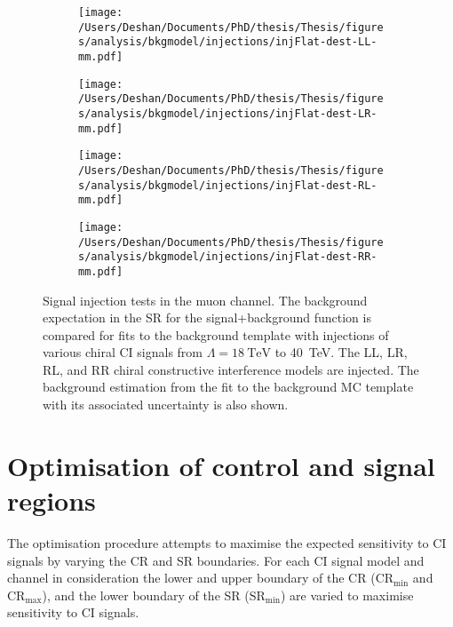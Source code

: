 \begin{figure}[h!]
    \centering
    \begin{subfigure}[b]{0.49\textwidth}
        \centering
        \texttt{[image: /Users/Deshan/Documents/PhD/thesis/Thesis/figures/analysis/bkgmodel/injections/injFlat-dest-LL-mm.pdf]}
        \label{fig:bkgmodel:injmm2}
    \end{subfigure}
    \begin{subfigure}[b]{0.49\textwidth}
        \centering
        \texttt{[image: /Users/Deshan/Documents/PhD/thesis/Thesis/figures/analysis/bkgmodel/injections/injFlat-dest-LR-mm.pdf]}
        \label{fig:bkgmodel:injmm4}
    \end{subfigure}
    \begin{subfigure}[b]{0.49\textwidth}
        \centering
        \texttt{[image: /Users/Deshan/Documents/PhD/thesis/Thesis/figures/analysis/bkgmodel/injections/injFlat-dest-RL-mm.pdf]}
        \label{fig:bkgmodel:injmm6}
    \end{subfigure}
    \begin{subfigure}[b]{0.49\textwidth}
        \centering
        \texttt{[image: /Users/Deshan/Documents/PhD/thesis/Thesis/figures/analysis/bkgmodel/injections/injFlat-dest-RR-mm.pdf]}
        \label{fig:bkgmodel:injmm8}
    \end{subfigure}
    \caption[Signal injection tests in the muon channel for destructive interference models]{Signal injection tests in the muon channel. The background expectation in the SR for the signal+background function is compared for fits to the background template with injections of various chiral CI signals from $\Lambda = \SI{18}{\tera\electronvolt}$ to \SI{40}{\tera\electronvolt}. The LL, LR, RL, and RR chiral constructive interference models are injected. The background estimation from the fit to the background MC template with its associated uncertainty is also shown.}
    \label{fig:bkgmodel:injmmdest}
\end{figure}

\clearpage
\section{Optimisation of control and signal regions}\label{sec:extrap:optimisation}
The optimisation procedure attempts to maximise the expected sensitivity to CI signals by varying the CR and SR boundaries. For each CI signal model and channel in consideration the lower and upper boundary of the CR ($\mathrm{CR}_{\mathrm{min}}$ and $\mathrm{CR}_{\mathrm{max}}$), and the lower boundary of the SR ($\mathrm{SR}_{\mathrm{min}}$) are varied to maximise sensitivity to CI signals. 

